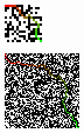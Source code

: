 \documentclass[10pt,twocolumn]{scrartcl}
\begin{document}
\begin{figure}[!h]
	\center
	\includegraphics*[width=\columnwidth]{"images/small_path.png"}
\end{figure}

\begin{figure}[!h]
	\center
	\includegraphics*[width=\columnwidth]{"images/big_path.png"}
\end{figure}
\end{document}
